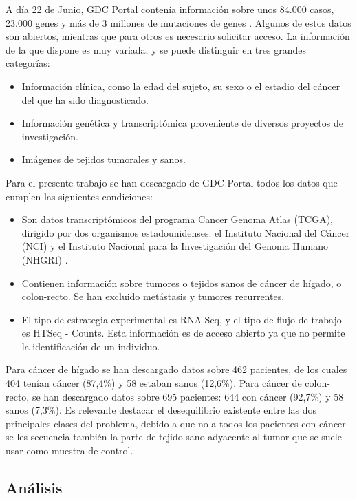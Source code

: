 A día 22 de Junio, GDC Portal contenía información sobre unos 84.000 casos, 23.000 genes y más de 3 millones de mutaciones de genes \cite{GDCPortal}. Algunos de estos datos son abiertos, mientras que para otros es necesario solicitar acceso. La información de la que dispone es muy variada, y se puede distinguir en tres grandes categorías:

\begin{itemize}
	\item Información clínica, como la edad del sujeto, su sexo o el estadio del cáncer del que ha sido diagnosticado.
	\item Información genética y transcriptómica proveniente de diversos proyectos de investigación.
	\item Imágenes de tejidos tumorales y sanos.
\end{itemize} 

Para el presente trabajo se han descargado de GDC Portal todos los datos que cumplen las siguientes condiciones:

\begin{itemize}
	\item Son datos transcriptómicos del programa Cancer Genoma Atlas (TCGA), dirigido por dos organismos estadounidenses: el Instituto Nacional del Cáncer (NCI) y el Instituto Nacional para la Investigación del Genoma Humano (NHGRI) \cite{NationalCancerInstitutea}. 
	\item Contienen información sobre tumores o tejidos sanos de cáncer de hígado, o colon-recto. Se han excluido metástasis y tumores recurrentes.
	\item El tipo de estrategia experimental es RNA-Seq, y el tipo de flujo de trabajo es HTSeq - Counts. Esta información es de acceso abierto ya que no permite la identificación de un individuo.
\end{itemize}

Para cáncer de hígado se han descargado datos sobre 462 pacientes, de los cuales 404 tenían cáncer (87,4\%) y 58 estaban sanos (12,6\%).  Para cáncer de colon-recto, se han descargado datos sobre 695 pacientes: 644 con cáncer (92,7\%) y 58 sanos (7,3\%). Es relevante destacar el desequilibrio existente entre las dos principales clases del problema, debido a que no a todos los pacientes con cáncer se les secuencia también la parte de tejido sano adyacente al tumor que se suele usar como muestra de control.

\subsection{Análisis}

